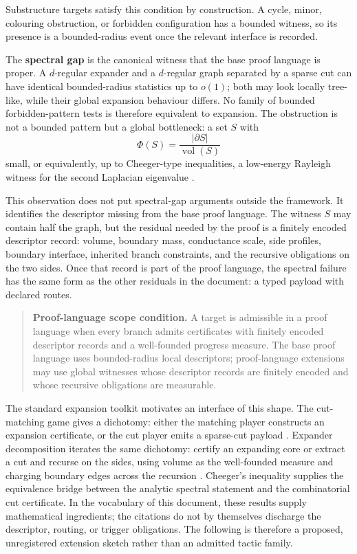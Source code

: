 \documentclass[
  11pt,
]{article}
\theoremstyle{definition}
\begin{document}
Substructure targets satisfy this condition by construction. A cycle,
minor, colouring obstruction, or forbidden configuration has a bounded
witness, so its presence is a bounded-radius event once the relevant
interface is recorded.

The \textbf{spectral gap} is the canonical witness that the base proof
language is proper. A \(d\)-regular expander and a \(d\)-regular graph separated by a
sparse cut can have identical bounded-radius statistics up to \(o(1)\);
both may look locally tree-like, while their global expansion behaviour
differs. No family of bounded forbidden-pattern tests is therefore
equivalent to expansion. The obstruction is not a bounded pattern but a
global bottleneck: a set \(S\) with
\[
\Phi(S)=\frac{|\partial S|}{\operatorname{vol}(S)}
\]
small, or equivalently, up to Cheeger-type inequalities, a low-energy
Rayleigh witness for the second Laplacian eigenvalue
\citep{chung-1997-spectral-graph-theory}.

This observation does not put spectral-gap arguments outside the
framework. It identifies the descriptor missing from the base proof language. The
witness \(S\) may contain half the graph, but the residual needed by the
proof is a finitely encoded descriptor record: volume, boundary mass,
conductance scale, side profiles, boundary interface, inherited branch
constraints, and the recursive obligations on the two sides. Once that
record is part
of the proof language, the spectral failure has the same form as the other
residuals in the document: a typed payload with declared routes.

\begin{quote}
\textbf{Proof-language scope condition.} A target is admissible in a
proof language when every branch admits certificates with finitely
encoded descriptor records and a well-founded progress measure. The base
proof language uses bounded-radius local descriptors; proof-language
extensions may use global witnesses whose descriptor records are finitely
encoded and whose recursive obligations are measurable.
\end{quote}

The standard expansion toolkit motivates an interface of this shape. The
cut-matching game gives a dichotomy: either the matching player constructs an
expansion certificate, or the cut player emits a sparse-cut payload
\citep{khandekar-rao-vazirani-2009-cut-matching}. Expander
decomposition iterates the same dichotomy: certify an expanding core or
extract a cut and recurse on the sides, using volume as the
well-founded measure and charging boundary edges across the recursion
\citep{saranurak-wang-2019-expander-decomposition}. Cheeger's
inequality supplies the equivalence bridge between the analytic spectral
statement and the combinatorial cut certificate. In the vocabulary of
this document, these results supply mathematical ingredients; the
citations do not by themselves discharge the descriptor, routing, or
trigger obligations. The following is therefore a proposed, unregistered
extension sketch rather than an admitted tactic family.
\end{document}

